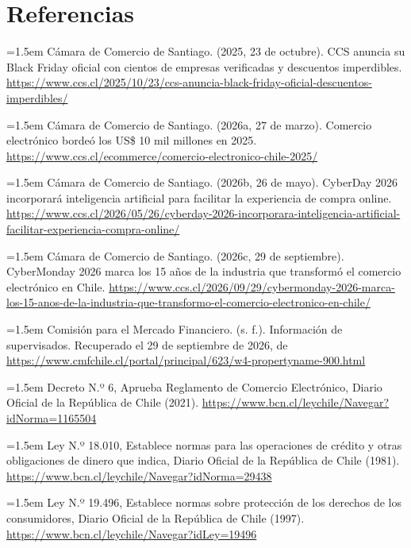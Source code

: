 \documentclass[11pt]{article}
\begin{document}
\section*{Referencias}

\noindent\hangindent=1.5em Cámara de Comercio de Santiago. (2025, 23 de octubre). CCS anuncia su Black Friday oficial con cientos de empresas verificadas y descuentos imperdibles. \url{https://www.ccs.cl/2025/10/23/ccs-anuncia-black-friday-oficial-descuentos-imperdibles/}

\noindent\hangindent=1.5em Cámara de Comercio de Santiago. (2026a, 27 de marzo). Comercio electrónico bordeó los US\$ 10 mil millones en 2025. \url{https://www.ccs.cl/ecommerce/comercio-electronico-chile-2025/}

\noindent\hangindent=1.5em Cámara de Comercio de Santiago. (2026b, 26 de mayo). CyberDay 2026 incorporará inteligencia artificial para facilitar la experiencia de compra online. \url{https://www.ccs.cl/2026/05/26/cyberday-2026-incorporara-inteligencia-artificial-facilitar-experiencia-compra-online/}

\noindent\hangindent=1.5em Cámara de Comercio de Santiago. (2026c, 29 de septiembre). CyberMonday 2026 marca los 15 años de la industria que transformó el comercio electrónico en Chile. \url{https://www.ccs.cl/2026/09/29/cybermonday-2026-marca-los-15-anos-de-la-industria-que-transformo-el-comercio-electronico-en-chile/}

\noindent\hangindent=1.5em Comisión para el Mercado Financiero. (s. f.). Información de supervisados. Recuperado el 29 de septiembre de 2026, de \url{https://www.cmfchile.cl/portal/principal/623/w4-propertyname-900.html}

\noindent\hangindent=1.5em Decreto N.º 6, Aprueba Reglamento de Comercio Electrónico, Diario Oficial de la República de Chile (2021). \url{https://www.bcn.cl/leychile/Navegar?idNorma=1165504}

\noindent\hangindent=1.5em Ley N.º 18.010, Establece normas para las operaciones de crédito y otras obligaciones de dinero que indica, Diario Oficial de la República de Chile (1981). \url{https://www.bcn.cl/leychile/Navegar?idNorma=29438}

\noindent\hangindent=1.5em Ley N.º 19.496, Establece normas sobre protección de los derechos de los consumidores, Diario Oficial de la República de Chile (1997). \url{https://www.bcn.cl/leychile/Navegar?idLey=19496}
\end{document}
